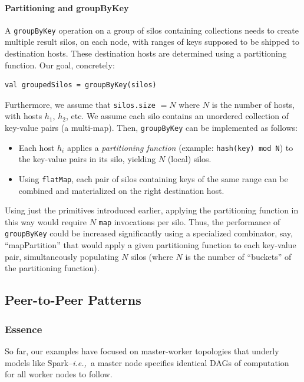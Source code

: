 \documentclass[preprint]{sigplanconf}
\theoremstyle{definition}
\theoremstyle{definition}
\newcommand{\ie}{{\em i.e.,~}}
\begin{document}
\paragraph{Partitioning and groupByKey}

A \verb|groupByKey| operation on a group of silos containing collections needs
to create multiple result silos, on each node, with ranges of keys supposed to
be shipped to destination hosts. These destination hosts are determined using a
partitioning function. Our goal, concretely:

\begin{lstlisting}
val groupedSilos = groupByKey(silos)
\end{lstlisting}
\noindent
Furthermore, we assume that \verb|silos.size| $= N$ where $N$ is the number of
hosts, with hosts $h_1$, $h_2$, etc. We assume each silo contains an unordered
collection of key-value pairs (a multi-map). Then, \verb|groupByKey| can be
implemented as follows:

\begin{itemize}
\item Each host $h_i$ applies a {\em partitioning function} (example:
  \texttt{hash(key) mod N}) to the key-value pairs in its silo, yielding $N$
  (local) silos.

\item Using \verb|flatMap|, each pair of silos containing keys of the same
  range can be combined and materialized on the right destination host.
\end{itemize}

Using just the primitives introduced earlier, applying the partitioning
function in this way would require $N$ \verb|map| invocations per silo. Thus,
the performance of \verb|groupByKey| could be increased significantly using a
specialized combinator, say, ``mapPartition'' that would apply a given
partitioning function to each key-value pair, simultaneously populating $N$
silos (where $N$ is the number of ``buckets'' of the partitioning function).

\subsection{Peer-to-Peer Patterns}
\label{sec:decentral}

\subsubsection{Essence}

So far, our examples have focused on master-worker topologies that underly
models like Spark--\ie a master node specifies identical DAGs of computation for
all worker nodes to follow.
\end{document}

